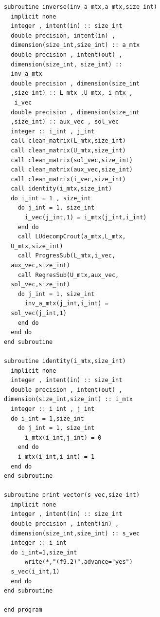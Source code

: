 \documentclass[twocolumn]{article}
\begin{document}
\begin{verbatim}
subroutine inverse(inv_a_mtx,a_mtx,size_int)
  implicit none
  integer , intent(in) :: size_int
  double precision, intent(in) , 
  dimension(size_int,size_int) :: a_mtx 
  double precision , intent(out) , 
  dimension(size_int, size_int) :: 
  inv_a_mtx 
  double precision , dimension(size_int
  ,size_int) :: L_mtx ,U_mtx, i_mtx ,
   i_vec
  double precision , dimension(size_int
  ,size_int) :: aux_vec , sol_vec
  integer :: i_int , j_int
  call clean_matrix(L_mtx,size_int)
  call clean_matrix(U_mtx,size_int)
  call clean_matrix(sol_vec,size_int)
  call clean_matrix(aux_vec,size_int)
  call clean_matrix(i_vec,size_int)
  call identity(i_mtx,size_int)
  do i_int = 1 , size_int
    do j_int = 1, size_int
      i_vec(j_int,1) = i_mtx(j_int,i_int)
    end do
    call LUdecompCrout(a_mtx,L_mtx,
  U_mtx,size_int)
    call ProgresSub(L_mtx,i_vec,
  aux_vec,size_int)
    call RegresSub(U_mtx,aux_vec,
  sol_vec,size_int)
    do j_int = 1, size_int
      inv_a_mtx(j_int,i_int) = 
  sol_vec(j_int,1)
    end do 
  end do
end subroutine

subroutine identity(i_mtx,size_int)
  implicit none
  integer , intent(in) :: size_int
  double precision , intent(out) , 
dimension(size_int,size_int) :: i_mtx
  integer :: i_int , j_int
  do i_int = 1,size_int
    do j_int = 1, size_int
      i_mtx(i_int,j_int) = 0
    end do 
    i_mtx(i_int,i_int) = 1
  end do 
end subroutine

subroutine print_vector(s_vec,size_int)
  implicit none
  integer , intent(in) :: size_int
  double precision , intent(in) , 
  dimension(size_int,size_int) :: s_vec
  integer :: i_int
  do i_int=1,size_int
      write(*,"(f9.2)",advance="yes")
  s_vec(i_int,1)
  end do 
end subroutine

end program
\end{verbatim}
\end{document}
